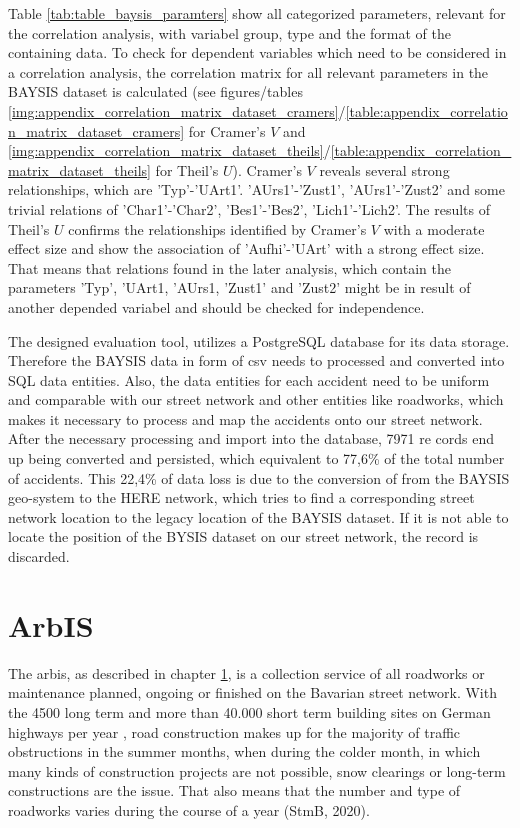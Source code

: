 \documentclass[a4paper,headsepline,footsepline,fontsize=11pt,BCOR=12mm,DIV=12]{report}
\begin{document}
Table \ref{tab:table_baysis_paramters} show all categorized parameters, relevant for the correlation analysis, with variabel group, type and the format of the containing data. To check for dependent variables which need to be considered in a correlation analysis, the correlation matrix for all relevant parameters in the BAYSIS dataset is calculated (see figures/tables \ref{img:appendix_correlation_matrix_dataset_cramers}/\ref{table:appendix_correlation_matrix_dataset_cramers} for Cramer's $V$ and \ref{img:appendix_correlation_matrix_dataset_theils}/\ref{table:appendix_correlation_matrix_dataset_theils} for Theil's $U$). Cramer's $V$ reveals several strong relationships, which are 'Typ'-'UArt1'. 'AUrs1'-'Zust1', 'AUrs1'-'Zust2' and some  trivial relations of 'Char1'-'Char2', 'Bes1'-'Bes2', 'Lich1'-'Lich2'. The results of Theil's $U$ confirms the relationships identified by Cramer's $V$ with a moderate effect size and show the association of 'Aufhi'-'UArt' with a strong effect size. That means that relations found in the later analysis, which contain the parameters 'Typ', 'UArt1, 'AUrs1, 'Zust1' and 'Zust2' might be in result of another depended variabel and should be checked for independence.

\bigskip

The designed evaluation tool, utilizes a PostgreSQL database for its data storage. Therefore the BAYSIS data in form of \acrfull{csv} needs to processed and converted into SQL data entities. Also, the data entities for each accident need to be uniform and comparable with our street network and other entities like roadworks, which makes it necessary to process and map the accidents onto our street network. After the necessary processing and import into the database, 7971 re cords end up being converted and persisted, which equivalent to 77,6\% of the total number of accidents. This 22,4\% of data loss is due to the conversion of from the BAYSIS geo-system to the HERE network, which tries to find a corresponding street network location to the legacy location of the BAYSIS dataset. If it is not able to locate the position of the BYSIS dataset on our street network, the record is discarded.

\section{ArbIS}
\label{dataset_arbis}

The \acrfull{arbis}, as described in chapter \ref{dataset_arbis}, is a collection service of all roadworks or maintenance planned, ongoing or finished on the Bavarian street network. With the 4500 long term and more than 40.000 short term building sites on German highways per year \cite{LAPID2018,Stmi2020}, road construction makes up for the majority of traffic obstructions in the summer months, when during the colder month, in which many kinds of construction projects are not possible, snow clearings or long-term constructions are the issue. That also means that the number and type of roadworks varies during the course of a year (StmB, 2020).
\end{document}
